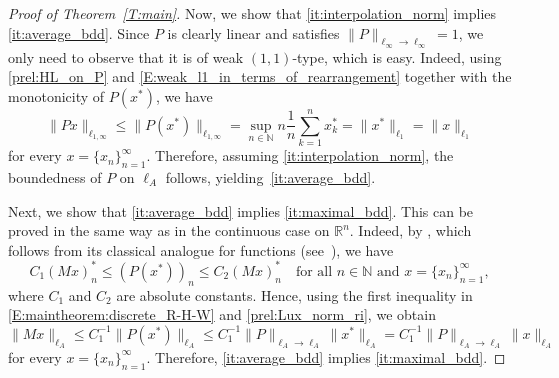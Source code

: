 \documentclass[nointlimits]{amsart}
\numberwithin{equation}{section}
\theoremstyle{plain}
\theoremstyle{definition}
\newcommand{\R}{\mathbb{R}}
\newcommand{\rn}{\R^n}
\newcommand{\N}{\mathbb{N}}
\newcommand{\lA}{\ell_A}
\def\rn{\mathbb R^n}
\begin{document}
\begin{proof}[Proof of Theorem~\ref{T:main}]
Now, we show that \ref{it:interpolation_norm} implies \ref{it:average_bdd}. Since $P$ is clearly linear and satisfies $\|P\|_{\ell_\infty\to\ell_\infty} = 1$, we only need to observe that it is of weak $(1,1)$-type, which is easy. Indeed, using \eqref{prel:HL_on_P} and \eqref{E:weak_l1_in_terms_of_rearrangement} together with the monotonicity of $P(x^*)$, we have
\begin{equation*}
    \|Px\|_{\ell_{1,\infty}} \leq \|P(x^*)\|_{\ell_{1,\infty}}  = \sup_{n\in\N} n \frac1{n}\sum_{k = 1}^n x^*_k = \|x^*\|_{\ell_1} = \|x\|_{\ell_1}
\end{equation*}
for every $x=\{x_n\}_{n = 1}^\infty$. Therefore, assuming \ref{it:interpolation_norm}, the boundedness of $P$ on $\lA$ follows, yielding~\ref{it:average_bdd}.

Next, we show that \ref{it:average_bdd} implies \ref{it:maximal_bdd}. This can be proved in the same way as in the continuous case on $\rn$. Indeed, by \cite[Lemma~11]{BG-E:06}, which follows from its classical analogue for functions (see~\cite[Chapter~3, Theorem~3.8]{BS}), we have
\begin{equation}\label{E:maintheorem:discrete_R-H-W}
    C_1 (Mx)_n^* \leq (P(x^*))_n \leq C_2 (Mx)_n^* \quad \text{for all $n\in\N$ and $x=\{x_n\}_{n = 1}^\infty$},
\end{equation}
where $C_1$ and $C_2$ are absolute constants. Hence, using the first inequality in \eqref{E:maintheorem:discrete_R-H-W} and \eqref{prel:Lux_norm_ri}, we obtain
\begin{equation*}
    \|Mx\|_{\lA} \leq C_1^{-1} \|P(x^*)\|_{\lA} \leq C_1^{-1}\|P\|_{\lA \to \lA} \|x^*\|_{\lA} = C_1^{-1}\|P\|_{\lA \to \lA} \|x\|_{\lA}
\end{equation*}
for every $x=\{x_n\}_{n = 1}^\infty$. Therefore, \ref{it:average_bdd} implies \ref{it:maximal_bdd}.


\end{proof}
\end{document}
